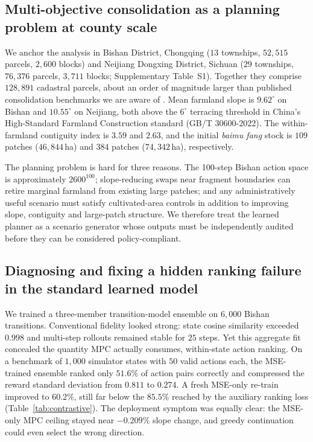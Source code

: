 \documentclass[11pt]{article}
\begin{document}
\subsection{Multi-objective consolidation as a planning problem at county scale}\label{sec:problem}

We anchor the analysis in Bishan District, Chongqing ($13$ townships, $52{,}515$ parcels, $2{,}600$ blocks) and Neijiang Dongxing District, Sichuan ($29$ townships, $76{,}376$ parcels, $3{,}711$ blocks; Supplementary Table~S1). Together they comprise $128{,}891$ cadastral parcels, about an order of magnitude larger than published consolidation benchmarks we are aware of \citep{cao2012boundary,zheng2023urban}. Mean farmland slope is $9.62^{\circ}$ on Bishan and $10.55^{\circ}$ on Neijiang, both above the $6^{\circ}$ terracing threshold in China's High-Standard Farmland Construction standard (GB/T 30600-2022). The within-farmland contiguity index is $3.59$ and $2.63$, and the initial \textit{baimu fang} stock is $109$ patches ($46{,}844$\,ha) and $384$ patches ($74{,}342$\,ha), respectively.

The planning problem is hard for three reasons. The 100-step Bishan action space is approximately $2600^{100}$; slope-reducing swaps near fragment boundaries can retire marginal farmland from existing large patches; and any administratively useful scenario must satisfy cultivated-area controls in addition to improving slope, contiguity and large-patch structure. We therefore treat the learned planner as a scenario generator whose outputs must be independently audited before they can be considered policy-compliant.

\subsection{Diagnosing and fixing a hidden ranking failure in the standard learned model}\label{sec:rank}

We trained a three-member transition-model ensemble on $6{,}000$ Bishan transitions. Conventional fidelity looked strong: state cosine similarity exceeded $0.998$ and multi-step rollouts remained stable for $25$ steps. Yet this aggregate fit concealed the quantity MPC actually consumes, within-state action ranking. On a benchmark of $1{,}000$ simulator states with $50$ valid actions each, the MSE-trained ensemble ranked only $51.6\%$ of action pairs correctly and compressed the reward standard deviation from $0.811$ to $0.274$. A fresh MSE-only re-train improved to $60.2\%$, still far below the $85.5\%$ reached by the auxiliary ranking loss (Table~\ref{tab:contrastive}). The deployment symptom was equally clear: the MSE-only MPC ceiling stayed near $-0.209\%$ slope change, and greedy continuation could even select the wrong direction.
\end{document}
